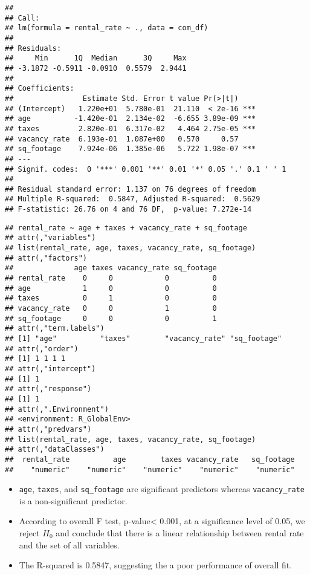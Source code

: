 \documentclass[]{article}
\newenvironment{Shaded}{\begin{snugshade}}{\end{snugshade}}
\newcommand{\NormalTok}[1]{#1}
\newcommand{\OperatorTok}[1]{\textcolor[rgb]{0.81,0.36,0.00}{\textbf{#1}}}
\begin{document}
\begin{verbatim}
## 
## Call:
## lm(formula = rental_rate ~ ., data = com_df)
## 
## Residuals:
##     Min      1Q  Median      3Q     Max 
## -3.1872 -0.5911 -0.0910  0.5579  2.9441 
## 
## Coefficients:
##                Estimate Std. Error t value Pr(>|t|)    
## (Intercept)   1.220e+01  5.780e-01  21.110  < 2e-16 ***
## age          -1.420e-01  2.134e-02  -6.655 3.89e-09 ***
## taxes         2.820e-01  6.317e-02   4.464 2.75e-05 ***
## vacancy_rate  6.193e-01  1.087e+00   0.570     0.57    
## sq_footage    7.924e-06  1.385e-06   5.722 1.98e-07 ***
## ---
## Signif. codes:  0 '***' 0.001 '**' 0.01 '*' 0.05 '.' 0.1 ' ' 1
## 
## Residual standard error: 1.137 on 76 degrees of freedom
## Multiple R-squared:  0.5847, Adjusted R-squared:  0.5629 
## F-statistic: 26.76 on 4 and 76 DF,  p-value: 7.272e-14
\end{verbatim}

\begin{Shaded}
\end{Shaded}

\begin{verbatim}
## rental_rate ~ age + taxes + vacancy_rate + sq_footage
## attr(,"variables")
## list(rental_rate, age, taxes, vacancy_rate, sq_footage)
## attr(,"factors")
##              age taxes vacancy_rate sq_footage
## rental_rate    0     0            0          0
## age            1     0            0          0
## taxes          0     1            0          0
## vacancy_rate   0     0            1          0
## sq_footage     0     0            0          1
## attr(,"term.labels")
## [1] "age"          "taxes"        "vacancy_rate" "sq_footage"  
## attr(,"order")
## [1] 1 1 1 1
## attr(,"intercept")
## [1] 1
## attr(,"response")
## [1] 1
## attr(,".Environment")
## <environment: R_GlobalEnv>
## attr(,"predvars")
## list(rental_rate, age, taxes, vacancy_rate, sq_footage)
## attr(,"dataClasses")
##  rental_rate          age        taxes vacancy_rate   sq_footage 
##    "numeric"    "numeric"    "numeric"    "numeric"    "numeric"
\end{verbatim}

\begin{itemize}
\item
  \texttt{age}, \texttt{taxes}, and \texttt{sq\_footage} are significant
  predictors whereas \texttt{vacancy\_rate} is a non-significant
  predictor.
\item
  According to overall F test, p-value\textless{} 0.001, at a
  significance level of 0.05, we reject \(H_0\) and conclude that there
  is a linear relationship between rental rate and the set of all
  variables.
\item
  The R-squared is 0.5847, suggesting the a poor performance of overall
  fit.
\end{itemize}
\end{document}
